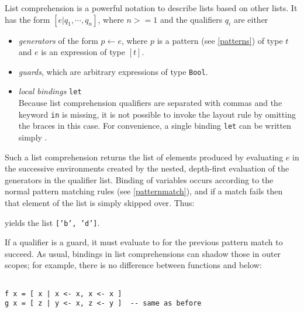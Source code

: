 List comprehension is a powerful notation to describe lists based on other lists. It has the form $[ e | q_1, \cdots, q_n]$, where $n>=1$ and the qualifiers $q_i$ are either
\begin{itemize}
\item \emph{generators} of the form $p \leftarrow{} e$, where $p$ is a pattern (see \autoref{patterns}) of type $t$ and $e$ is an expression of type $[t]$.
\item \emph{guards}, which are arbitrary expressions of type \texttt{Bool}.
\item \emph{local bindings} \texttt{let} \bracea{}  \bracez{}\\
Because list comprehension qualifiers are separated with commas and the keyword \texttt{in} is missing, 
it is not possible to invoke the layout rule by omitting the braces in this case. 
For convenience, a single binding \texttt{let} \bracea{}  \bracez{}
can be written simply .
\end{itemize}

Such a list comprehension returns the list of elements produced by evaluating $e$ in the successive environments created by the nested, depth-first evaluation of the generators in the qualifier list.
Binding of variables occurs according to the normal pattern matching rules (see \autoref{patternmatch}), and if a match fails then that element of the list is simply skipped over.
Thus:


yields the list \texttt{['b', 'd']}.

If a qualifier is a guard, it must evaluate to  for the previous pattern match to succeed.
As usual, bindings in list comprehensions can shadow those in outer scopes; for example, there is no difference between functions  and  below:

\begin{verbatim}

f x = [ x | x <- x, x <- x ]
g x = [ z | y <- x, z <- y ]  -- same as before

\end{verbatim}


